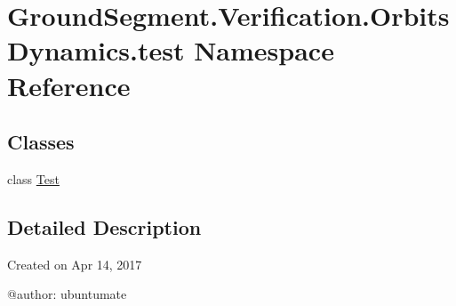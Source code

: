 \hypertarget{namespace_ground_segment_1_1_verification_1_1_orbits_dynamics_1_1test}{}\section{Ground\+Segment.\+Verification.\+Orbits\+Dynamics.\+test Namespace Reference}
\label{namespace_ground_segment_1_1_verification_1_1_orbits_dynamics_1_1test}
\subsection*{Classes}
\begin{DoxyCompactItemize}
\item 
class \hyperlink{class_ground_segment_1_1_verification_1_1_orbits_dynamics_1_1test_1_1_test}{Test}
\end{DoxyCompactItemize}


\subsection{Detailed Description}
\begin{DoxyVerb}Created on Apr 14, 2017

@author: ubuntumate
\end{DoxyVerb}
 